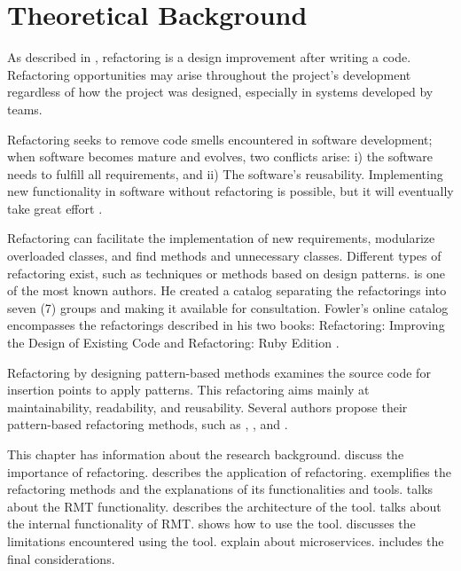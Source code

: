 \chapter{Theoretical Background}
\label{cap-background}

As described in \textcite{fowler2018refactoring}, refactoring is a design improvement after writing a code. Refactoring opportunities may arise throughout the project's development regardless of how the project was designed, especially in systems developed by teams.

Refactoring seeks to remove code smells encountered in software development; when software becomes mature and evolves, two conflicts arise: i) the software needs to fulfill all requirements, and ii) The software's reusability. Implementing new functionality in software without refactoring is possible, but it will eventually take great effort \cite{Gamma2009}.

Refactoring can facilitate the implementation of new requirements, modularize overloaded classes, and find methods and unnecessary classes. Different types of refactoring exist, such as techniques or methods based on design patterns. \textcite{fowler2018refactoring} is one of the most known authors. He created a catalog separating the refactorings into seven (7) groups and making it available for consultation. Fowler's online catalog encompasses the refactorings described in his two books: Refactoring: Improving the Design of Existing Code \cite{fowler2018refactoring} and Refactoring: Ruby Edition \cite{fields2009refactoring}. 

Refactoring by designing pattern-based methods examines the source code for insertion points to apply patterns. This refactoring aims mainly at maintainability, readability, and reusability. Several authors propose their pattern-based refactoring methods, such as \textcite{cinneide2000automated}, \textcite{Gamma2009}, and \textcite{ouni2017more}.

This chapter has information about the research background.  discuss the importance of refactoring.  describes the application of refactoring.  exemplifies the refactoring methods and the explanations of its functionalities and tools.  talks about the RMT functionality.  describes the architecture of the tool.  talks about the internal functionality of RMT.  shows how to use the tool.  discusses the limitations encountered using the tool.  explain about microservices.  includes the final considerations.

